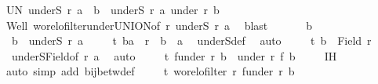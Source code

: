 \begin{isabellebody}
\ UN{\isacharcolon}{\kern0pt}\ {\isachardoublequoteopen}underS\ r\ a\ {\isacharequal}{\kern0pt}\ {\isacharparenleft}{\kern0pt}{\isasymUnion}b\ {\isasymin}\ underS\ r\ a{\isachardot}{\kern0pt}\ under\ r\ b{\isacharparenright}{\kern0pt}{\isachardoublequoteclose}\isanewline
\ \ \isamarkupfalse%
\ Well\ wo{\isacharunderscore}{\kern0pt}rel{\isachardot}{\kern0pt}ofilter{\isacharunderscore}{\kern0pt}under{\isacharunderscore}{\kern0pt}UNION{\isacharbrackleft}{\kern0pt}of\ r\ {\isachardoublequoteopen}underS\ r\ a{\isachardoublequoteclose}{\isacharbrackright}{\kern0pt}\ \isamarkupfalse%
\ blast\isanewline
\ \ \isanewline
\ \ \isacommand{{\isacharbraceleft}{\kern0pt}}\isamarkupfalse%
\isamarkupfalse%
\ b\ \isamarkupfalse%
\ {\isacharasterisk}{\kern0pt}{\isacharcolon}{\kern0pt}\ {\isachardoublequoteopen}b\ {\isasymin}\ underS\ r\ a{\isachardoublequoteclose}\isanewline
\ \ \ \isamarkupfalse%
\ t{}{\isacharcolon}{\kern0pt}\ {\isachardoublequoteopen}{\isacharparenleft}{\kern0pt}b{\isacharcomma}{\kern0pt}a{\isacharparenright}{\kern0pt}\ {\isasymin}\ r\ {\isasymand}\ b\ {\isasymnoteq}\ a{\isachardoublequoteclose}\ \isamarkupfalse%
\ underS{\isacharunderscore}{\kern0pt}def\ \isamarkupfalse%
\ auto\isanewline
\ \ \ \isamarkupfalse%
\ t{}{\isacharcolon}{\kern0pt}\ {\isachardoublequoteopen}b\ {\isasymin}\ Field\ r{\isachardoublequoteclose}\isanewline
\ \ \ \isamarkupfalse%
\ {\isacharasterisk}{\kern0pt}\ underS{\isacharunderscore}{\kern0pt}Field{\isacharbrackleft}{\kern0pt}of\ r\ a{\isacharbrackright}{\kern0pt}\ \isamarkupfalse%
\ auto\isanewline
\ \ \ \isamarkupfalse%
\ t{}{\isacharcolon}{\kern0pt}\ {\isachardoublequoteopen}f{\isacharbackquote}{\kern0pt}{\isacharparenleft}{\kern0pt}under\ r\ b{\isacharparenright}{\kern0pt}\ {\isacharequal}{\kern0pt}\ under\ r{\isacharprime}{\kern0pt}\ {\isacharparenleft}{\kern0pt}f\ b{\isacharparenright}{\kern0pt}{\isachardoublequoteclose}\isanewline
\ \ \ \isamarkupfalse%
\ IH\ {\isacharasterisk}{\kern0pt}\ \isamarkupfalse%
\ {\isacharparenleft}{\kern0pt}auto\ simp\ add{\isacharcolon}{\kern0pt}\ bij{\isacharunderscore}{\kern0pt}betw{\isacharunderscore}{\kern0pt}def{\isacharparenright}{\kern0pt}\isanewline
\ \ \ \isamarkupfalse%
\ t{}{\isacharcolon}{\kern0pt}\ {\isachardoublequoteopen}wo{\isacharunderscore}{\kern0pt}rel{\isachardot}{\kern0pt}ofilter\ r{\isacharprime}{\kern0pt}\ {\isacharparenleft}{\kern0pt}f{\isacharbackquote}{\kern0pt}{\isacharparenleft}{\kern0pt}under\ r\ b{\isacharparenright}{\kern0pt}{\isacharparenright}{\kern0pt}{\isachardoublequoteclose}\isanewline

\end{isabellebody}
